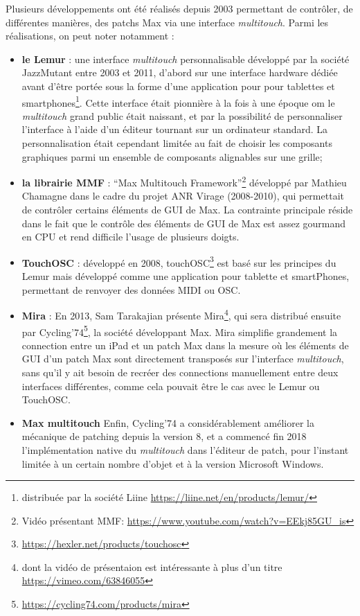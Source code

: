 \noindent Plusieurs développements ont été réalisés depuis 2003 permettant de contrôler, de différentes manières, des patchs Max via une interface \textit{multitouch}. Parmi les réalisations, on peut noter notamment :
\vspace{-1em}
\begin{itemize}[noitemsep]
	\item \textbf{le Lemur} : une interface \textit{multitouch} personnalisable développé par la société JazzMutant entre 2003 et 2011, d'abord sur une interface hardware dédiée avant d'être portée sous la forme d'une application pour pour tablettes et smartphones\footnote{distribuée par la société Liine \url{https://liine.net/en/products/lemur/}}. Cette interface était pionnière à la fois à une époque om le \textit{multitouch} grand public était naissant, et par la possibilité de personnaliser l'interface à l'aide d'un éditeur tournant sur un ordinateur standard. La personnalisation était cependant limitée au fait de choisir les composants graphiques parmi un ensemble de composants alignables sur une grille;

	\item \textbf{la librairie MMF} : ``Max Multitouch Framework''\footnote{Vidéo présentant MMF: \url{https://www.youtube.com/watch?v=EEkj85GU_is}} développé par Mathieu Chamagne dans le cadre du projet \gls{ANR} Virage (2008-2010), qui permettait de contrôler certains éléments de \gls{GUI} de Max. La contrainte principale réside dans le fait que le contrôle des éléments de \gls{GUI} de Max est assez gourmand en \gls{CPU} et rend difficile l'usage de plusieurs doigts.

	\item \textbf{TouchOSC} : développé en 2008, touchOSC\footnote{\url{https://hexler.net/products/touchosc}} est basé sur les principes du Lemur mais développé comme une application pour tablette et smartPhones, permettant de renvoyer des données \gls{MIDI} ou \gls{OSC}.

	\item \textbf{Mira} : En 2013, Sam Tarakajian présente Mira\footnote{dont la vidéo de présentaion est intéressante à plus d'un titre \url{https://vimeo.com/63846055}}, qui sera distribué ensuite par Cycling'74\footnote{\url{https://cycling74.com/products/mira}}, la société développant Max. Mira simplifie grandement la connection entre un iPad et un patch Max dans la mesure où les éléments de \gls{GUI} d'un patch Max sont directement transposés sur l'interface \textit{multitouch}, sans qu'il y ait besoin de recréer des connections manuellement entre deux interfaces différentes, comme cela pouvait être le cas avec le Lemur ou TouchOSC.

	\item \textbf{Max multitouch} Enfin, Cycling'74 a considérablement améliorer la mécanique de patching depuis la version 8, et a commencé fin 2018 l'implémentation native du \textit{multitouch} dans l'éditeur de patch, pour l'instant limitée à un certain nombre d'objet et à la version Microsoft Windows.
\end{itemize}

